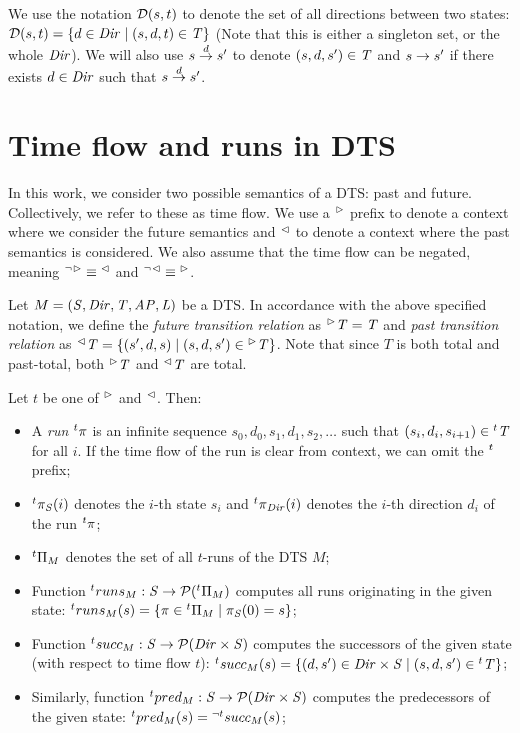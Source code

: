 We use the notation $\mathcal{D}(s, t)$ to denote the set of all directions between two states: $\mathcal{D}(s, t) = \{ d \in \mathit{Dir} \mid (s, d, t) \in \mathit{T} \}$ (Note that this is either a singleton set, or the whole $\mathit{Dir}$). We will also use $s \stackrel{d}{\rightarrow} s'$ to denote $(s, d, s') \in \mathit{T}$ and $s \rightarrow s'$ if there exists $d \in \mathit{Dir}$ such that $s \stackrel{d}{\rightarrow} s'$.

\section{Time flow and runs in \ac{DTS}}

In this work, we consider two possible semantics of a \ac{DTS}: past and future. Collectively, we refer to these as time flow. We use a ${}^\vartriangleright$ prefix to denote a context where we consider the future semantics and ${}^\vartriangleleft$ to denote a context where the past semantics is considered. We also assume that the time flow can be negated, meaning ${}^{\neg}{}^\vartriangleright \equiv {}^\vartriangleleft$ and ${}^{\neg}{}^\vartriangleleft \equiv {}^\vartriangleright$.

Let $M = (\mathit{S}, \mathit{Dir}, \mathit{T}, \mathit{AP}, \mathit{L})$ be a \ac{DTS}. In accordance with the above specified notation, we define the \emph{future transition relation} as ${}^\vartriangleright\mathit{T} = \mathit{T}$ and \emph{past transition relation} as ${}^\vartriangleleft\mathit{T} = \{ (s', d, s) \mid (s, d, s') \in {}^\vartriangleright{\mathit{T}} \}$. Note that since $T$ is both total and past-total, both ${}^\vartriangleright\mathit{T}$ and ${}^\vartriangleleft\mathit{T}$ are total.

Let $t$ be one of ${}^\vartriangleright{}$ and ${}^\vartriangleleft{}$. Then:

\begin{itemize}
	\item A \emph{run} ${}^{t}\pi$ is an infinite sequence $s_0, d_0, s_1, d_1, s_2, \ldots$ such that $(s_i, d_{i}, s_{i+1}) \in {}^{t}\mathit{T}$ for all $i$. If the time flow of the run is clear from context, we can omit the ${}^{t}$ prefix;
	\item ${}^{t}\pi_{\mathit{S}}(i)$ denotes the $i$-th state $s_i$ and ${}^{t}\pi_{\mathit{Dir}}(i)$ denotes the $i$-th direction $d_i$ of the run ${}^{t}\pi$;
	\item ${}^{t}\Pi_M$ denotes the set of all $t$-runs of the \ac{DTS} $M$;
	\item Function ${}^{t}runs_M : \mathit{S} \rightarrow \mathcal{P}({}^{t}\Pi_M)$ computes all runs originating in the given state: ${}^{t}runs_M(s) = \{ \pi \in {}^{t}\Pi_M \mid \pi_{\mathit{S}}(0) = s\}$;
	\item Function ${}^{t}succ_M : \mathit{S} \rightarrow \mathcal{P}(\mathit{Dir} \times \mathit{S})$ computes the successors of the given state (with respect to time flow $t$):
	${}^{t}succ_M(s) = \{ (d, s') \in \mathit{Dir} \times \mathit{S} \mid (s,d,s') \in {}^{t} \mathit{T} \}$;
	\item Similarly, function ${}^{t}pred_M : \mathit{S} \rightarrow \mathcal{P}(\mathit{Dir} \times \mathit{S})$ computes the predecessors of the given state: ${}^{t}pred_M(s) = {}^{\neg t}succ_M(s)$;
\end{itemize}

